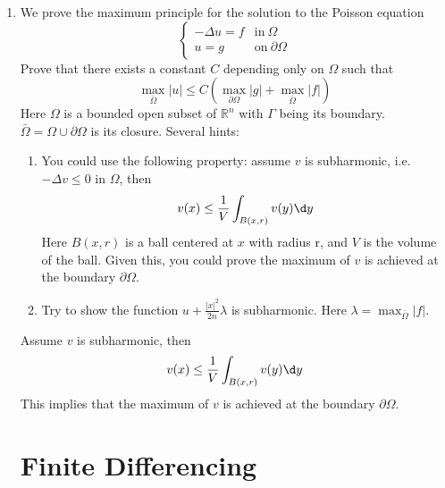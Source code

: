 \documentclass{article}
\newcommand\NoIndent[1]{%
  \begingroup
  \par
  \parshape0
  #1\par
  \endgroup
}
\begin{document}
\begin{enumerate}
	\item We prove the maximum principle for the solution to the Poisson equation
		\begin{equation*}
			\begin{cases}
				-\Delta u = f & \mathrm{in\ } \Omega \\
				u = g & \mathrm{on\ } \partial\Omega
			\end{cases}
		\end{equation*}
		Prove that there exists a constant $C$ depending only on $\Omega$ such that
		\begin{equation*}
			\max_{\bar{\Omega}}|u| \leq C\left(\max_{\partial\Omega}|g| + \max_{\bar{\Omega}}|f|\right)
		\end{equation*}
		Here $\Omega$ is a bounded open subset of $\mathbb{R}^n$ with $\Gamma$ being its boundary.
		$\bar{\Omega} = \Omega \cup \partial\Omega$ is its closure.
		Several hints:
		\begin{enumerate}
			\item You could use the following property:
				assume $v$ is subharmonic, i.e.\ $-\Delta v \leq 0$ in $\Omega$, then
				\begin{equation*}
					v(x) \leq \frac{1}{V}\int_{B(x,r)}v(y)\d y
				\end{equation*}
				Here $B(x,r)$ is a ball centered at $x$ with radius r, and $V$ is the volume of the ball.
				Given this, you could prove the maximum of $v$ is achieved at the boundary $\partial\Omega$.
			\item Try to show the function $u + \displaystyle\frac{|x|^2}{2n}\lambda$ is subharmonic.
			Here $\lambda = \displaystyle\max_{\bar{\Omega}}|f|$.
		\end{enumerate}

\NoIndent{
	Assume $v$ is subharmonic, then
	\begin{equation*}
		v(x) \leq \frac{1}{V}\int_{B(x,r)}v(y)\d y
	\end{equation*}
	This implies that the maximum of $v$ is achieved at the boundary $\partial\Omega$.
	 
}

\NoIndent{\section{Finite Differencing}}


\end{enumerate}
\end{document}
